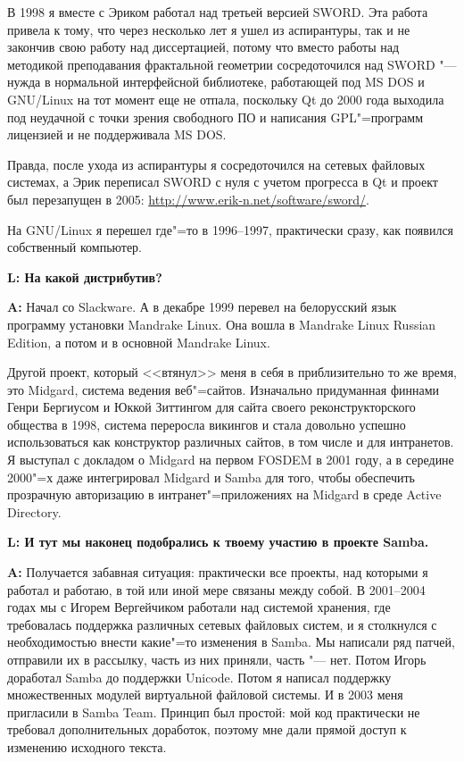 \documentclass[10pt, a5paper]{article}
\begin{document}
В 1998 я вместе с Эриком работал над третьей версией SWORD. Эта работа привела
к тому, что через несколько лет я ушел из аспирантуры, так и не закончив свою
работу над диссертацией, потому что вместо работы над методикой преподавания
фрактальной геометрии сосредоточился над SWORD "--- нужда в нормальной
интерфейсной библиотеке, работающей под MS DOS и GNU/Linux на тот момент еще не
отпала, поскольку Qt до 2000 года выходила под неудачной с точки зрения свободного ПО и написания
GPL"=программ лицензией и не поддерживала MS DOS.

Правда, после ухода из аспирантуры я сосредоточился на сетевых файловых системах,
а Эрик переписал SWORD с нуля с учетом прогресса в Qt и проект был перезапущен в 2005: 
\url{http://www.erik-n.net/software/sword/}. 

На GNU/Linux я перешел где"=то в 1996--1997, практически сразу, как появился
собственный компьютер.

{\noindent \bf L: На какой дистрибутив?}

{\noindent \bf A:} Начал со Slackware. А в декабре 1999 перевел на белорусский язык программу установки Mandrake Linux. Она вошла в Mandrake Linux Russian Edition, а потом и в основной Mandrake Linux.

Другой проект, который <<втянул>> меня в себя в приблизительно то же время, это
Midgard, система ведения веб"=сайтов. Изначально придуманная финнами Генри
Бергиусом и Юккой Зиттингом для сайта своего реконструкторского общества в
1998, система переросла викингов и стала довольно успешно использоваться как
конструктор различных сайтов, в том числе и для интранетов. Я выступал с докладом
о Midgard на первом FOSDEM в 2001 году, а в середине 2000"=х даже интегрировал
Midgard и Samba для того, чтобы обеспечить прозрачную авторизацию в
интранет"=приложениях на Midgard в среде Active Directory.

{\noindent \bf L: И тут мы наконец подобрались к твоему участию в проекте Samba. }

{\noindent \bf A:} Получается забавная ситуация: практически все проекты, над которыми я работал и
работаю, в той или иной мере связаны между собой. В 2001--2004 годах мы с Игорем
Вергейчиком работали над системой хранения, где требовалась поддержка различных
сетевых файловых систем, и я столкнулся с необходимостью внести какие"=то
изменения в Samba.  Мы написали ряд патчей, отправили их в рассылку, часть из
них приняли, часть "--- нет.  Потом Игорь доработал Samba до поддержки Unicode.
Потом я написал поддержку множественных модулей виртуальной файловой системы. И в
2003 меня пригласили в Samba Team. Принцип был простой: мой код практически
не требовал дополнительных доработок, поэтому мне дали прямой доступ к
изменению исходного текста.
\end{document}
